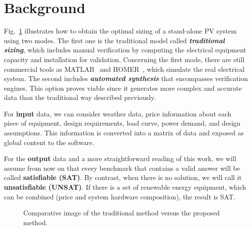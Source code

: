 \documentclass[review]{elsarticle}
\begin{document}
\section{Background}
\label{sec:Background}
Fig.~\ref{fig:optimization} illustrates how to obtain the optimal sizing of a stand-alone PV system using two modes. The first one is the traditional model called \textit{\textbf{traditional sizing}}, which includes manual verification by computing the electrical equipment capacity and installation for validation. Concerning the first mode, there are still commercial tools as MATLAB~\citep{Benatiallah2017} and HOMER~\citep{Pradhan,Swarnkar}, which simulate the real electrical system. The second includes \textbf{\textit{automated synthesis}} that encompasses verification engines. This option proves viable since it generates more complex and accurate data than the traditional way described previously. 

For \textbf{input} data, we can consider weather data, price information about each piece of equipment, design requirements, load curve, power demand, and design assumptions. This information is converted into a matrix of data and exposed as global content to the software.

For the \textbf{output} data and a more straightforward reading of this work, we will assume from now on that every benchmark that contains a valid answer will be called \textbf{satisfiable (SAT)}. By contrast, when there is no solution, we will call it \textbf{unsatisfiable (UNSAT)}. If there is a set of renewable energy equipment, which can be combined (price and system hardware composition), the result is SAT.

\begin{figure}[ht]
\begin{center}
\end{center}
\caption{Comparative image of the traditional method versus the proposed method.}
\label{fig:optimization}
\end{figure}
  
\end{document}
